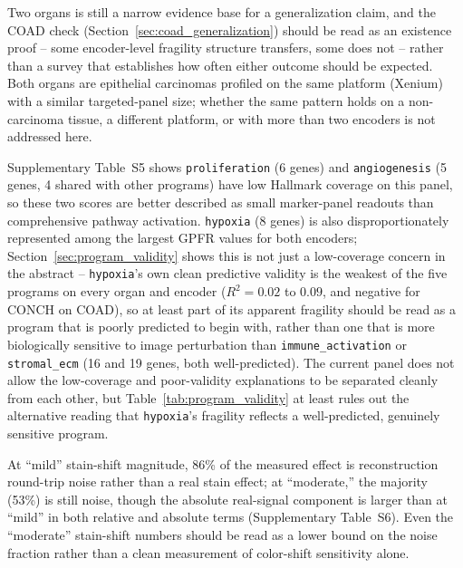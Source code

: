 \documentclass[11pt]{article}
\begin{document}
Two organs is still a narrow evidence base for a generalization claim, and the COAD check (Section~\ref{sec:coad_generalization}) should be read as an existence proof -- some encoder-level fragility structure transfers, some does not -- rather than a survey that establishes how often either outcome should be expected. Both organs are epithelial carcinomas profiled on the same platform (Xenium) with a similar targeted-panel size; whether the same pattern holds on a non-carcinoma tissue, a different platform, or with more than two encoders is not addressed here.

Supplementary Table~S5 shows \texttt{proliferation} (6 genes) and \texttt{angiogenesis} (5 genes, 4 shared with other programs) have low Hallmark coverage on this panel, so these two scores are better described as small marker-panel readouts than comprehensive pathway activation. \texttt{hypoxia} (8 genes) is also disproportionately represented among the largest GPFR values for both encoders; Section~\ref{sec:program_validity} shows this is not just a low-coverage concern in the abstract -- \texttt{hypoxia}'s own clean predictive validity is the weakest of the five programs on every organ and encoder ($R^2=0.02$ to $0.09$, and negative for CONCH on COAD), so at least part of its apparent fragility should be read as a program that is poorly predicted to begin with, rather than one that is more biologically sensitive to image perturbation than \texttt{immune\_activation} or \texttt{stromal\_ecm} (16 and 19 genes, both well-predicted). The current panel does not allow the low-coverage and poor-validity explanations to be separated cleanly from each other, but Table~\ref{tab:program_validity} at least rules out the alternative reading that \texttt{hypoxia}'s fragility reflects a well-predicted, genuinely sensitive program.

At ``mild'' stain-shift magnitude, 86\% of the measured effect is reconstruction round-trip noise rather than a real stain effect; at ``moderate,'' the majority (53\%) is still noise, though the absolute real-signal component is larger than at ``mild'' in both relative and absolute terms (Supplementary Table~S6). Even the ``moderate'' stain-shift numbers should be read as a lower bound on the noise fraction rather than a clean measurement of color-shift sensitivity alone.
\end{document}
